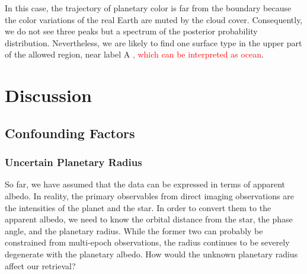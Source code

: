 \documentclass[iop,numberedappendix,apj]{emulateapj}
\def\edit#1{\textcolor{red}{#1}}
\begin{document}
In this case, the trajectory of planetary color is far from the boundary because the color variations of the real Earth are muted by the cloud cover. 
Consequently, we do not see three peaks but a spectrum of the posterior probability distribution. 
Nevertheless, we are likely to find one surface type in the upper part of the allowed region, near label A \edit{, which can be interpreted as ocean}. 


\section{Discussion}
\label{s:discussion}

\subsection{Confounding Factors}
\label{ss:confonting_factors}


\subsubsection{Uncertain Planetary Radius}


So far, we have assumed that the data can be expressed in terms of apparent albedo. 
In reality, the primary observables from direct imaging observations are the intensities of the planet and the star. 
In order to convert them to the apparent albedo, we need to know the orbital distance from the star, the phase angle, and the planetary radius. 
While the former two can probably be constrained from multi-epoch observations, the radius continues to be severely degenerate with the planetary albedo. 
How would the unknown planetary radius affect our retrieval? 
\end{document}
